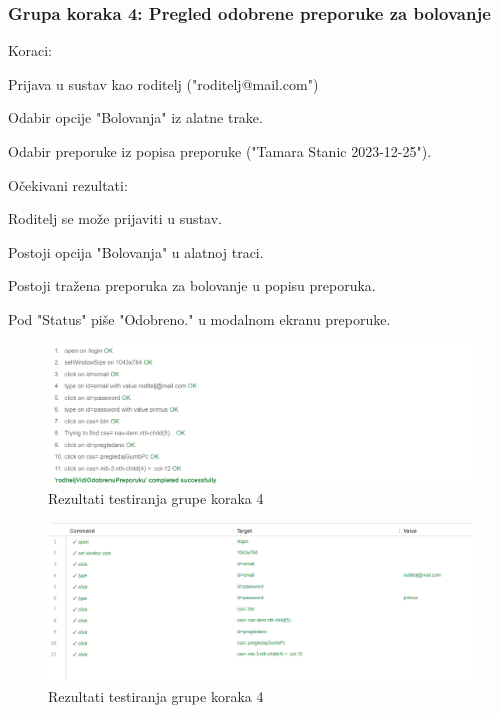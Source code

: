 			 \subsubsection*{Grupa koraka 4: Pregled odobrene preporuke za bolovanje}
			 Koraci:
			 \begin{packed_enum}
				\item Prijava u sustav kao roditelj ("roditelj@mail.com")
				\item Odabir opcije "Bolovanja" iz alatne trake.
				\item Odabir preporuke iz popisa preporuke ("Tamara Stanic 2023-12-25").
			 \end{packed_enum}
			 Očekivani rezultati:
			 \begin{packed_enum}
				\item Roditelj se može prijaviti u sustav.
				\item Postoji opcija "Bolovanja" u alatnoj traci.
				\item Postoji tražena preporuka za bolovanje u popisu preporuka.
				\item Pod "Status" piše "Odobreno." u modalnom ekranu preporuke.
			 \end{packed_enum}
			\eject

			\begin{figure}[H]
				\includegraphics[width=\textwidth]{slike/selenium4.1.png} 
				\caption{Rezultati testiranja grupe koraka 4} 
			\end{figure}

			\begin{figure}[H]
				\includegraphics[width=\textwidth]{slike/selenium4.2.png} 
				\caption{Rezultati testiranja grupe koraka 4} 
			\end{figure}
		
